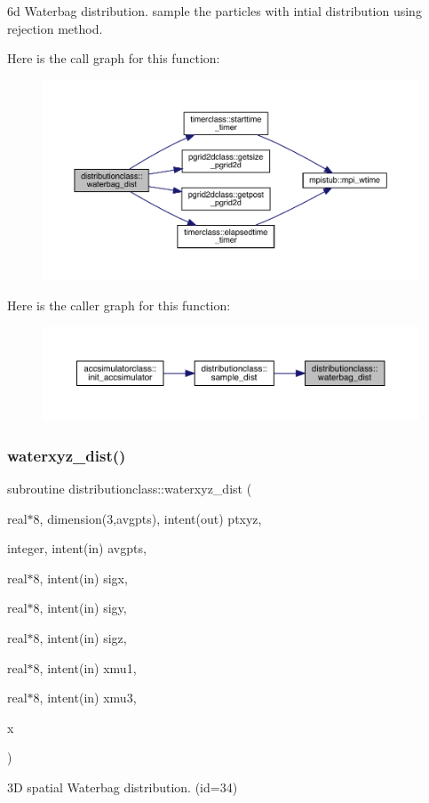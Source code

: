 6d Waterbag distribution. sample the particles with intial distribution using rejection method. 

Here is the call graph for this function\+:\nopagebreak
\begin{figure}[H]
\begin{center}
\leavevmode
\includegraphics[width=350pt]{namespacedistributionclass_aed734df6d00f7004cf11847adb42dd1d_cgraph}
\end{center}
\end{figure}
Here is the caller graph for this function\+:\nopagebreak
\begin{figure}[H]
\begin{center}
\leavevmode
\includegraphics[width=350pt]{namespacedistributionclass_aed734df6d00f7004cf11847adb42dd1d_icgraph}
\end{center}
\end{figure}
\mbox{\label{namespacedistributionclass_a2b070800bac220b6560be536eaa0d780}} 
\subsubsection{\texorpdfstring{waterxyz\_dist()}{waterxyz\_dist()}}
{\footnotesize\ttfamily subroutine distributionclass\+::waterxyz\+\_\+dist (\begin{DoxyParamCaption}\item[{real$\ast$8, dimension(3,avgpts), intent(out)}]{ptxyz,  }\item[{integer, intent(in)}]{avgpts,  }\item[{real$\ast$8, intent(in)}]{sigx,  }\item[{real$\ast$8, intent(in)}]{sigy,  }\item[{real$\ast$8, intent(in)}]{sigz,  }\item[{real$\ast$8, intent(in)}]{xmu1,  }\item[{real$\ast$8, intent(in)}]{xmu3,  }\item[{}]{x }\end{DoxyParamCaption})}



3D spatial Waterbag distribution. (id=34) 

